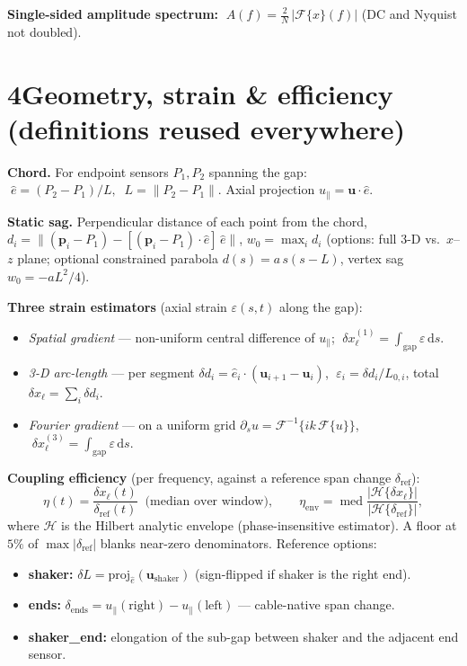 \documentclass[11pt,a4paper]{article}
\begin{document}
\textbf{Single-sided amplitude spectrum:}
$\;A(f)=\tfrac{2}{N}\,\big|\mathcal{F}\{x\}(f)\big|$ (DC and Nyquist not doubled).

\section*{4\quad Geometry, strain \& efficiency (definitions reused everywhere)}
\textbf{Chord.} For endpoint sensors $P_1,P_2$ spanning the gap:
$\;\hat{e}=(P_2-P_1)/L,\;\; L=\lVert P_2-P_1\rVert.$ Axial projection $u_\parallel=\mathbf{u}\cdot\hat e$.

\textbf{Static sag.} Perpendicular distance of each point from the chord,
$d_i=\big\lVert(\mathbf p_i-P_1)-[(\mathbf p_i-P_1)\cdot\hat e]\,\hat e\big\rVert$, $w_0=\max_i d_i$
(options: full 3-D vs.\ $x$--$z$ plane; optional constrained parabola
$d(s)=a\,s(s-L)$, vertex sag $w_0=-aL^2/4$).

\textbf{Three strain estimators} (axial strain $\varepsilon(s,t)$ along the gap):
\begin{itemize}
\item[\textbf{M1}] \emph{Spatial gradient} --- non-uniform central difference of $u_\parallel$;
$\;\delta x_\ell^{(1)}=\int_{\mathrm{gap}}\varepsilon\,\mathrm{d}s.$
\item[\textbf{M2}] \emph{3-D arc-length} --- per segment $\delta d_i=\hat e_i\cdot(\mathbf u_{i+1}-\mathbf u_i)$,
$\;\varepsilon_i=\delta d_i/L_{0,i}$, total $\delta x_\ell=\sum_i\delta d_i.$
\item[\textbf{M3}] \emph{Fourier gradient} --- on a uniform grid $\partial_s u=\mathcal F^{-1}\{ik\,\mathcal F\{u\}\}$,
$\;\delta x_\ell^{(3)}=\int_{\mathrm{gap}}\varepsilon\,\mathrm{d}s.$
\end{itemize}

\textbf{Coupling efficiency} (per frequency, against a reference span change $\delta_{\mathrm{ref}}$):
\begin{equation}
\eta(t)=\frac{\delta x_\ell(t)}{\delta_{\mathrm{ref}}(t)}\;\;\text{(median over window)},
\qquad
\eta_{\mathrm{env}}=\operatorname{med}\frac{|\mathcal H\{\delta x_\ell\}|}{|\mathcal H\{\delta_{\mathrm{ref}}\}|},
\end{equation}
where $\mathcal H$ is the Hilbert analytic envelope (phase-insensitive estimator). A floor at $5\%$ of $\max|\delta_{\mathrm{ref}}|$ blanks near-zero denominators. Reference options:
\begin{itemize}
\item \textbf{shaker:} $\delta L=\mathrm{proj}_{\hat e}(\mathbf u_{\mathrm{shaker}})$ (sign-flipped if shaker is the right end).
\item \textbf{ends:} $\delta_{\mathrm{ends}}=u_\parallel(\text{right})-u_\parallel(\text{left})$ --- cable-native span change.
\item \textbf{shaker\_end:} elongation of the sub-gap between shaker and the adjacent end sensor.
\end{itemize}
\end{document}
